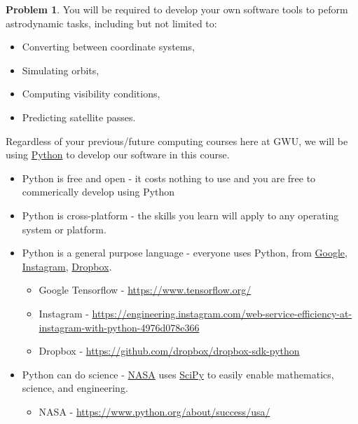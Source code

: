 \documentclass[10pt]{article}
\theoremstyle{definition}
\newtheorem{prob}{Problem}[section]
\begin{document}
\begin{prob}
You will be required to develop your own software tools to peform astrodynamic tasks, including but not limited to:
\begin{itemize}
    \item Converting between coordinate systems,
    \item Simulating orbits,
    \item Computing visibility conditions,
    \item Predicting satellite passes.
\end{itemize} 
Regardless of your previous/future computing courses here at GWU, we will be using \href{https://www.python.org/}{Python} to develop our software in this course.
\begin{itemize}
    \item Python is free and open - it costs nothing to use and you are free to commerically develop using Python
    \item Python is cross-platform - the skills you learn will apply to any operating system or platform. 
    \item Python is a general purpose language - everyone uses Python, from \href{https://www.tensorflow.org/}{Google}, \href{https://engineering.instagram.com/web-service-efficiency-at-instagram-with-python-4976d078e366}{Instagram}, \href{https://github.com/dropbox/dropbox-sdk-python}{Dropbox}.
        \begin{itemize}
            \item Google Tensorflow - \href{https://www.tensorflow.org/}{https://www.tensorflow.org/}
            \item Instagram - \href{https://engineering.instagram.com/web-service-efficiency-at-instagram-with-python-4976d078e366}{https://engineering.instagram.com/web-service-efficiency-at-instagram-with-python-4976d078e366}
            \item Dropbox - \href{https://github.com/dropbox/dropbox-sdk-python}{https://github.com/dropbox/dropbox-sdk-python}
        \end{itemize}
    \item Python can do science - \href{https://www.python.org/about/success/usa/}{NASA} uses \href{https://www.scipy.org/}{SciPy} to easily enable mathematics, science, and engineering.
        \begin{itemize}
            \item NASA - \href{https://www.python.org/about/success/usa/}{https://www.python.org/about/success/usa/}

\end{itemize}
\end{itemize}
\end{prob}
\end{document}
